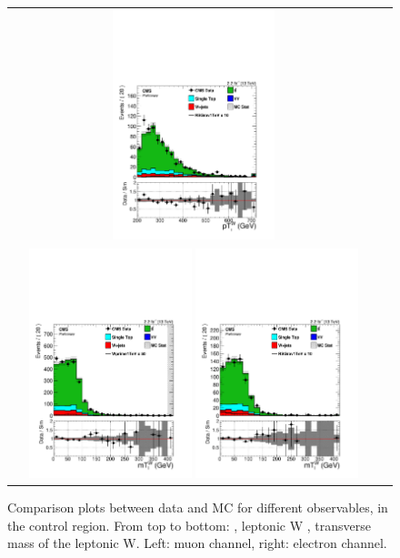 \begin{figure}[htbp]
\begin{tabular}{cc}
 \includegraphics[width=0.45\textwidth]{chapters/Chapter8-EventSelection/Figures/WVanalysis/ControlPlots_TTbar/el/v_pt_0}\\
 \includegraphics[width=0.45\textwidth]{chapters/Chapter8-EventSelection/Figures/WVanalysis/ControlPlots_TTbar/mu/v_mt_0}
 \includegraphics[width=0.45\textwidth]{chapters/Chapter8-EventSelection/Figures/WVanalysis/ControlPlots_TTbar/el/v_mt_0}\\
 \end{tabular}
 \caption{Comparison plots between data and MC for different observables, in the \ttbar control region.
 From top to bottom: \MET, leptonic W \pt, transverse mass of the leptonic W. 
 Left: muon channel, right: electron channel. }
 \label{fig:TTbar_controlPlots_2}
 \end{figure}

